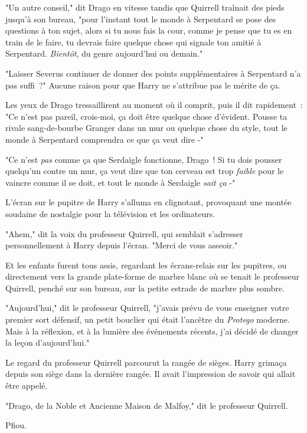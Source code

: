 "Un autre conseil," dit Drago en vitesse tandis que Quirrell traînait des pieds jusqu'à son bureau, "pour l'instant tout le monde à Serpentard se pose des questions à ton sujet, alors si tu nous fais la cour, comme je pense que tu es en train de le faire, tu devrais faire quelque chose qui signale ton amitié à Serpentard. \emph{Bientôt}, du genre aujourd'hui ou demain."

"Laisser Severus continuer de donner des points supplémentaires à Serpentard n'a pas suffi~?" Aucune raison pour que Harry ne s'attribue pas le mérite de ça.

Les yeux de Drago tressaillirent au moment où il comprit, puis il dit rapidement~: "Ce n'est pas pareil, crois-moi, ça doit être quelque chose d'évident. Pousse ta rivale sang-de-bourbe Granger dans un mur ou quelque chose du style, tout le monde à Serpentard comprendra ce que ça veut dire -"

"Ce n'est \emph{pas} comme ça que Serdaigle fonctionne, Drago~! Si tu dois pousser quelqu'un contre un mur, ça veut dire que ton cerveau est trop \emph{faible} pour le vaincre comme il se doit, et tout le monde à Serdaigle \emph{sait ça} -"

L'écran sur le pupitre de Harry s'alluma en clignotant, provoquant une montée soudaine de nostalgie pour la télévision et les ordinateurs.

"Ahem," dit la voix du professeur Quirrell, qui semblait s'adresser personnellement à Harry depuis l'écran. "Merci de vous asseoir."

\later

Et les enfants furent tous assis, regardant les écrans-relais sur les pupitres, ou directement vers la grande plate-forme de marbre blanc où se tenait le professeur Quirrell, penché sur son bureau, sur la petite estrade de marbre plus sombre.

"Aujourd'hui," dit le professeur Quirrell, "j'avais prévu de vous enseigner votre premier sort défensif, un petit bouclier qui était l'ancêtre du \emph{Protego} moderne. Mais à la réflexion, et à la lumière des événements récents, j'ai décidé de changer la leçon d'aujourd'hui."

Le regard du professeur Quirrell parcourut la rangée de sièges. Harry grimaça depuis son siège dans la dernière rangée. Il avait l'impression de savoir qui allait être appelé.

"Drago, de la Noble et Ancienne Maison de Malfoy," dit le professeur Quirrell.

Pfiou.

